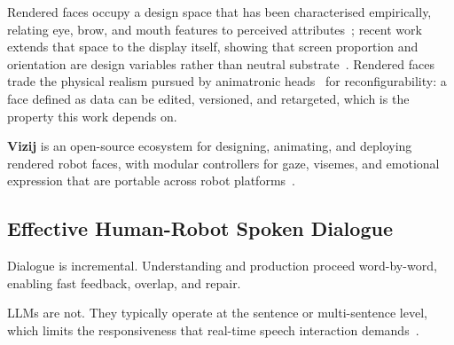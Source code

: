 \documentclass[conference]{IEEEtran}
\begin{document}
Rendered faces occupy a design space that has been characterised
empirically, relating eye, brow, and mouth features to perceived
attributes~\cite{kalegina2018facespace}; recent work extends that space to
the display itself, showing that screen proportion and orientation are design
variables rather than neutral
substrate~\cite{screens2026,longface2026}. Rendered faces trade the physical
realism pursued by animatronic heads~\cite{hyperrealistic2026} for
reconfigurability: a face defined as data can be edited, versioned, and
retargeted, which is the property this work depends on.

\textbf{Vizij} is an open-source ecosystem for designing, animating, and
deploying rendered robot faces, with modular controllers for gaze, visemes,
and emotional expression that are portable across robot
platforms~\cite{elbeleidy2026vizij,elbeleidy2026tutorial}.

\subsection{Effective Human-Robot Spoken Dialogue}

%
Dialogue is incremental. Understanding and production proceed word-by-word,
enabling fast feedback, overlap, and repair.

LLMs are not. They typically operate at the sentence or multi-sentence level,
which limits the responsiveness that real-time speech interaction
demands~\cite{kennington2025prior}.
\end{document}
